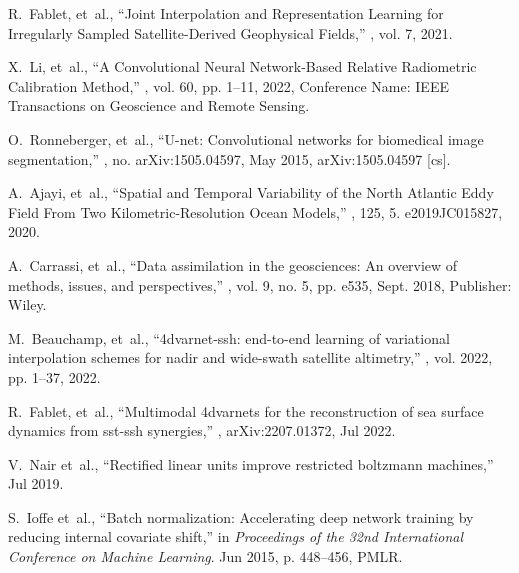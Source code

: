 \begin{bibunit}
\begin{thebibliography}{10}
R.~Fablet, et~al.,
\newblock ``Joint {Interpolation} and {Representation} {Learning} for
  {Irregularly} {Sampled} {Satellite}-{Derived} {Geophysical} {Fields},''
, vol. 7, 2021.

X.~Li, et~al.,
\newblock ``A {Convolutional} {Neural} {Network}-{Based} {Relative}
  {Radiometric} {Calibration} {Method},''
, vol. 60,
  pp. 1--11, 2022,
\newblock Conference Name: IEEE Transactions on Geoscience and Remote Sensing.

O.~Ronneberger, et~al.,
\newblock ``U-net: Convolutional networks for biomedical image segmentation,''
\newblock , no. arXiv:1505.04597, May 2015,
\newblock arXiv:1505.04597 [cs].

A.~Ajayi, et~al.,
\newblock ``Spatial and {Temporal} {Variability} of the {North} {Atlantic}
  {Eddy} {Field} {From} {Two} {Kilometric}-{Resolution} {Ocean} {Models},''
, 125, 5.
  e2019JC015827, 2020.

A.~Carrassi, et~al.,
\newblock ``Data assimilation in the geosciences: {An} overview of methods,
  issues, and perspectives,''
, vol. 9, no. 5,
  pp. e535, Sept. 2018,
\newblock Publisher: Wiley.

M.~Beauchamp, et~al.,
\newblock ``4dvarnet-ssh: end-to-end learning of variational interpolation
  schemes for nadir and wide-swath satellite altimetry,''
, vol. 2022, pp.
  1–37, 2022.

R.~Fablet, et~al.,
\newblock ``Multimodal 4dvarnets for the reconstruction of sea surface dynamics
  from sst-ssh synergies,''
\newblock , arXiv:2207.01372, Jul 2022.

V.~Nair et~al.,
\newblock ``Rectified linear units improve restricted boltzmann machines,''
\newblock Jul 2019.

S.~Ioffe et~al.,
\newblock ``Batch normalization: Accelerating deep network training by reducing
  internal covariate shift,''
\newblock in {\em Proceedings of the 32nd International Conference on Machine
  Learning}. Jun 2015, p. 448–456, PMLR.


\end{thebibliography}
\end{bibunit}
